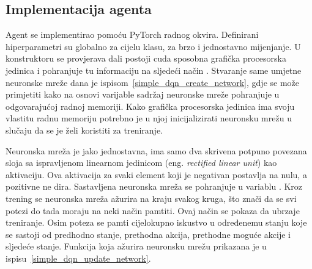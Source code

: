\subsection{Implementacija agenta}
Agent se implementirao pomoću PyTorch radnog okvira. Definirani hiperparametri su globalno za cijelu klasu, za brzo i jednostavno mijenjanje. U konstruktoru se provjerava dali postoji cuda sposobna grafička procesorska jedinica i pohranjuje tu informaciju na sljedeći način . Stvaranje same umjetne neuronske mreže dana je ispisom~\ref{simple_dqn_create_network}, gdje se može primjetiti kako na osnovi varijable  sadržaj neuronske mreže pohranjuje u odgovarajućoj radnoj memoriji. Kako grafička procesorska jedinica ima svoju vlastitu radnu memoriju potrebno je u njoj inicijalizirati neuronsku mrežu u slučaju da se je želi koristiti za treniranje.


Neuronska mreža je jako jednostavna, ima samo dva skrivena potpuno povezana sloja sa ispravljenom linearnom jedinicom (eng. \textit{rectified linear unit}) kao aktivaciju. Ova aktivacija za svaki element koji je negativan postavlja na nulu, a pozitivne ne dira. Sastavljena neuronska mreža se pohranjuje u variablu . Kroz trening se neuronska mreža ažurira na kraju svakog kruga, što znači da se svi potezi do tada moraju na neki način pamtiti. Ovaj način se pokaza da ubrzaje treniranje. Osim poteza se pamti cijelokupno iskustvo u određenemu stanju koje se sastoji od predhodno stanje, prethodna akcija, prethodne moguće akcije i sljedeće stanje. Funkcija koja ažurira neuronsku mrežu prikazana je u ispisu~\ref{simple_dqn_update_network}.



